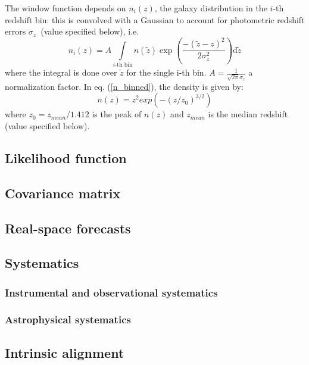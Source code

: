 The window function depends on $n_{i}(z)$, the galaxy distribution
in the $i$-th redshift bin: this is convolved with a Gaussian to account for photometric
redshift errors $\sigma_{z}$~(value specified below), i.e.~
\begin{equation}
n_{i}(z)=A \int\limits _{i\text{-th bin}}n({\tilde z})\exp\left(\frac{-(\tilde{z}-z)^{2}}{2 \sigma_{z}^{2}}\right)\mathrm{d}\tilde{z}
\label{n_binned}
\end{equation}
 where the integral is done over $\tilde{z}$ for the single i-th bin. 
$A = \frac{1}{\sqrt{2\pi} \sigma_z}$ a normalization factor.
In eq. (\ref{n_binned}), the density is given by: 
\begin{equation}
n(z) = z^2 exp(-(z/z_0)^{3/2})
\end{equation}
where $z_0 = z_{mean}/1.412$ is the peak of $n(z)$ and $z_{mean}$ is the median redshift (value specified below).

\subsection{Likelihood function}


\subsection{Covariance matrix}


\subsection{Real-space forecasts}


\subsection{Systematics}


\subsubsection{Instrumental and observational systematics}


\subsubsection{Astrophysical systematics}


\subsection{Intrinsic alignment}

